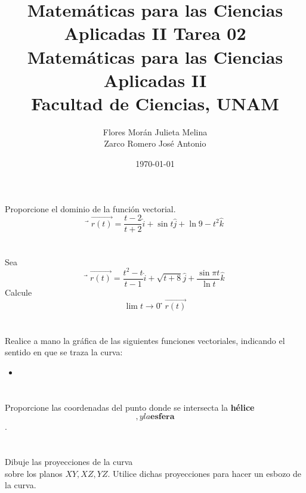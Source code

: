 \documentclass[12pt]{article}
\title{Matemáticas para las Ciencias Aplicadas II}
\title{
	\textbf{Tarea 02} \\
	\vspace{1ex}
	\large Matemáticas para las Ciencias Aplicadas II \\
	Facultad de Ciencias, UNAM}
\date{\today}
\author{Flores Morán Julieta Melina \\ Zarco Romero José Antonio}
\begin{document}
\maketitle

\section{}
Proporcione el dominio de la función vectorial.
$$
⃗\vec{r(t)}
=
\frac{t-2}{t+2}\hat{i}
+
\sin{t}\hat{j}
+
\ln{9-t^2}\hat{k}
$$

\section{}
Sea
$$
⃗\vec{r(t)}
=
\frac{t^2-t}{t-1}\hat{i}
+
\sqrt{t+8}\hat{j}
+
\frac{\sin{\pi t}}{\ln{t}}\hat{k}
$$
Calcule $$ \lim{t \to 0} ⃗\vec{r(t)} $$

\section{}
Realice a mano la gráfica de las siguientes funciones vectoriales, indicando el sentido en que se traza la curva:
\begin{itemize}[format=\textbf]

\item 

\end{itemize}

\section{}
Proporcione las coordenadas del punto donde se intersecta la \textbf{hélice} $$, y la \textbf{esfera} $$.

\section{}
Dibuje las proyecciones de la curva
⃗$$
$$
sobre los planos $XY , XZ, YZ$. Utilice dichas proyecciones para hacer un esbozo de la curva.
\end{document}
